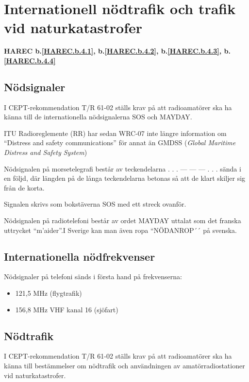 \section{Internationell nödtrafik och trafik vid naturkatastrofer}
\textbf{
HAREC b.\ref{HAREC.b.4.1}\label{myHAREC.b.4.1},
 b.\ref{HAREC.b.4.2}\label{myHAREC.b.4.2},
 b.\ref{HAREC.b.4.3}\label{myHAREC.b.4.3},
 b.\ref{HAREC.b.4.4}\label{myHAREC.b.4.4}
}

\subsection{Nödsignaler}

I CEPT-rekommendation T/R 61-02 ställs krav på att radioamatörer ska ha känna
till de internationella nödsignalerna SOS och MAYDAY.

ITU Radioreglemente (RR) har sedan WRC-07 inte längre information om
``Distress and safety communications'' för annat än GMDSS (\emph{Global Maritime Distress and Safety System})

Nödsignalen på morsetelegrafi består av teckendelarna . . . --- --- --- . . .
sända i en följd, där längden på de långa teckendelarna betonas så att de klart
skiljer sig från de korta.

Signalen skrivs som bokstäverna SOS med ett streck ovanför.

Nödsignalen på radiotelefoni består av ordet MAYDAY uttalat som det franska
uttrycket ``m'aider''.I Sverige kan man även ropa ``NÖDANROP´´ på svenska.

\subsection{Internationella nödfrekvenser}

Nödsignaler på telefoni sänds i första hand på frekvenserna:
\begin{itemize}
	\item 121,5 MHz (flygtrafik)
	\item 156,8 MHz VHF kanal 16 (sjöfart)
\end{itemize}

\subsection{Nödtrafik}

I CEPT-rekommendation T/R 61-02 ställs krav på att radioamatörer ska ha känna
till bestämmelser om nödtrafik och användningen av amatörradiostationer vid
naturkatastrofer.

